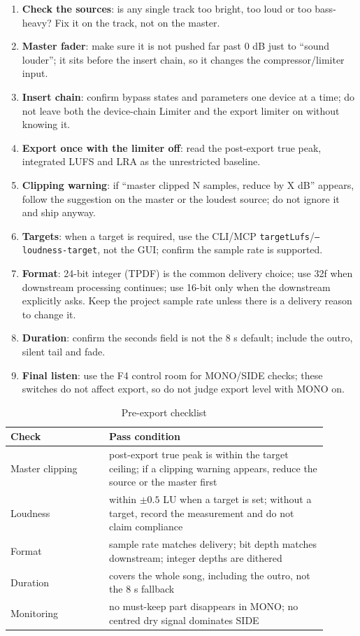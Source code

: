 \begin{enumerate}
  \item \textbf{Check the sources}: is any single track too bright, too loud or too bass-heavy? Fix it on the track, not on the master.
  \item \textbf{Master fader}: make sure it is not pushed far past 0 dB just to ``sound louder''; it sits before the insert chain, so it changes the compressor/limiter input.
  \item \textbf{Insert chain}: confirm bypass states and parameters one device at a time; do not leave both the device-chain Limiter and the export limiter on without knowing it.
  \item \textbf{Export once with the limiter off}: read the post-export true peak, integrated LUFS and LRA as the unrestricted baseline.
  \item \textbf{Clipping warning}: if ``master clipped N samples, reduce by X dB'' appears, follow the suggestion on the master or the loudest source; do not ignore it and ship anyway.
  \item \textbf{Targets}: when a target is required, use the CLI/MCP \texttt{targetLufs}/\texttt{--loudness-target}, not the GUI; confirm the sample rate is supported.
  \item \textbf{Format}: 24-bit integer (TPDF) is the common delivery choice; use 32f when downstream processing continues; use 16-bit only when the downstream explicitly asks. Keep the project sample rate unless there is a delivery reason to change it.
  \item \textbf{Duration}: confirm the seconds field is not the 8 s default; include the outro, silent tail and fade.
  \item \textbf{Final listen}: use the F4 control room for MONO/SIDE checks; these switches do not affect export, so do not judge export level with MONO on.
\end{enumerate}

\begin{table}[htbp]
\centering
\small
\begin{tabular}{@{}p{0.28\linewidth}p{0.62\linewidth}@{}}
\hline
Check & Pass condition \\
\hline
Master clipping & post-export true peak is within the target ceiling; if a clipping warning appears, reduce the source or the master first \\
Loudness & within $\pm0.5$ LU when a target is set; without a target, record the measurement and do not claim compliance \\
Format & sample rate matches delivery; bit depth matches downstream; integer depths are dithered \\
Duration & covers the whole song, including the outro, not the 8 s fallback \\
Monitoring & no must-keep part disappears in MONO; no centred dry signal dominates SIDE \\
\hline
\end{tabular}
\caption{Pre-export checklist}
\label{tab:export-checklist}
\end{table}

